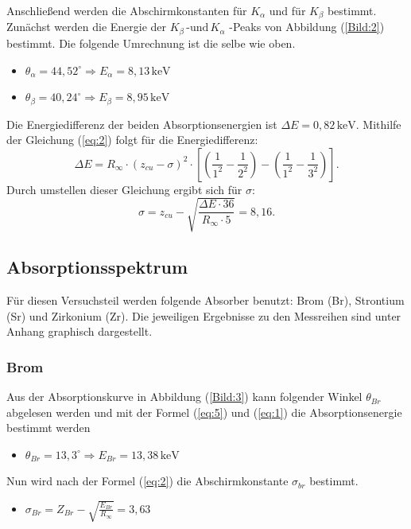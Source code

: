 Anschließend werden die Abschirmkonstanten für $K_\alpha$ und für $K_\beta$ bestimmt.
Zunächst werden die Energie der $K_\beta \, \text{-und}\, K_\alpha$ -Peaks von Abbildung (\ref{Bild:2}) bestimmt.
Die folgende Umrechnung ist die selbe wie oben.
\begin{itemize}
  \item $\theta_\alpha = 44,52^\circ \Rightarrow E_\alpha = 8,13 \,\text{keV}$
  \item $\theta_\beta = 40,24^\circ \Rightarrow E_\beta = 8,95 \,\text{keV}$
\end{itemize}
Die Energiedifferenz der beiden Absorptionsenergien ist $\Delta E = 0,82 \, \text{keV}$.
Mithilfe der Gleichung (\ref{eq:2}) folgt für die Energiedifferenz:
\begin{equation*}
  \Delta E = R_\infty \cdot (z_{cu} - \sigma)^2 \cdot [(\frac{1}{1^2}-\frac{1}{2^2})-(\frac{1}{1^2}-\frac{1}{3^2})].
\end{equation*}
Durch umstellen dieser Gleichung ergibt sich für $\sigma$:
\begin{equation*}
  \sigma = z_{cu} - \sqrt{\frac{\Delta E \cdot 36}{R_\infty \cdot 5}} = 8,16.
\end{equation*}

\subsection{Absorptionsspektrum}
Für diesen Versuchsteil werden folgende Absorber benutzt: Brom (Br), Strontium (Sr) und Zirkonium (Zr).
Die jeweiligen Ergebnisse zu den Messreihen sind unter Anhang graphisch dargestellt.
\subsubsection{Brom}
Aus der Absorptionskurve in Abbildung (\ref{Bild:3}) kann folgender Winkel $\theta_{Br}$ abgelesen werden und mit der Formel (\ref{eq:5}) und (\ref{eq:1}) die
Absorptionsenergie bestimmt werden
\begin{itemize}
  \item $\theta_{Br} = 13,3^\circ \Rightarrow E_{Br} = 13,38 \, \text{keV}$
\end{itemize}
Nun wird nach der Formel (\ref{eq:2}) die Abschirmkonstante $\sigma_{br}$ bestimmt.
\begin{itemize}
  \item $\sigma_{Br} = Z_{Br} - \sqrt{\frac{E_{Br}}{R_\infty}} = 3,63$
\end{itemize}

